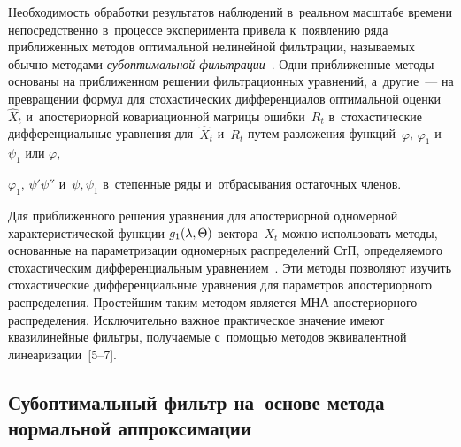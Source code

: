 \begin{multicols}{2}
 Необходимость обработки результатов наблюдений в~реальном
 масштабе времени непосредственно в~процессе эксперимента
 привела  к~появлению ряда приближенных методов оптимальной нелинейной  фильтрации,
 называемых обычно методами \textit{субоптимальной фильтрации}~\cite{7-s1}. Одни
 приближенные методы основаны на  приближенном решении фильтрационных
 уравнений, а~другие~---  на превращении формул  для стохастических дифференциалов оптимальной
 оценки~$\hat X_t$ и~апостериорной ковариационной  матрицы ошибки~$R_t$ 
 в~стохастические дифференциальные уравнения  для~$\hat X_t$ и~$R_t$ путем разложения 
 функций~$\varphi$, $\varphi_1$ и~$\psi_1$ или $\varphi$,\linebreak\vspace*{-12pt}
 
 \pagebreak
 
 \noindent
  $\varphi_1$, 
 $\psi'\psi''$ и~$\psi, \psi_1$ в~степенные ряды и~отбрасывания остаточных членов.

 Для приближенного решения уравнения  для апостериорной
одномерной характеристической функции  $g_1(\lambda, \Theta)$ вектора~$X_t$ можно
использовать методы, основанные на параметризации одномерных
 распределений СтП, определяемого стохастическим
 дифференциальным уравнением~\cite{7-s1, 6-s1}.  Эти\linebreak
  методы  позволяют изучить
 стохастические диф\-ференциальные уравнения для параметров
 апостериорного распределения. Простейшим таким методом является
 МНА апостериорного распределения. Исключительно важное практическое значение имеют квазилинейные
фильтры, по\-лу\-ча\-емые с~по\-мощью методов эквивалентной линеаризации~[5--7].


\subsection{Субоптимальный фильтр на~основе метода нормальной
аппроксимации}


\end{multicols}
